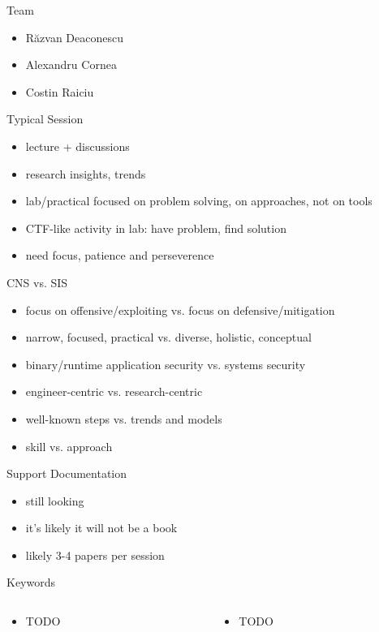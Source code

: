 \documentclass{curs}
\begin{document}
\begin{frame}{Team}
  \begin{itemize}
    \item Răzvan Deaconescu
    \item Alexandru Cornea
    \item Costin Raiciu
  \end{itemize}
\end{frame}

\begin{frame}{Typical Session}
  \begin{itemize}
    \item lecture + discussions
    \item research insights, trends
    \item lab/practical focused on problem solving, on approaches, not on tools
    \item CTF-like activity in lab: have problem, find solution
    \item need focus, patience and perseverence
  \end{itemize}
\end{frame}

\begin{frame}{CNS vs. SIS}
  \begin{itemize}
    \item focus on offensive/exploiting vs. focus on defensive/mitigation
    \item narrow, focused, practical vs. diverse, holistic, conceptual
    \item binary/runtime application security vs. systems security
    \item engineer-centric vs. research-centric
    \item well-known steps vs. trends and models
    \item skill vs. approach
  \end{itemize}
\end{frame}

\begin{frame}{Support Documentation}
  \begin{itemize}
    \item still looking
    \item it's likely it will not be a book
    \item likely 3-4 papers per session
  \end{itemize}
\end{frame}

\begin{frame}{Keywords}
  \begin{columns}
    \begin{column}{0.5\textwidth}
      \begin{itemize}
        \item TODO
      \end{itemize}
    \end{column}
    \begin{column}{0.5\textwidth}
      \begin{itemize}
        \item TODO
      \end{itemize}
    \end{column}
  \end{columns}
\end{frame}
\end{document}
